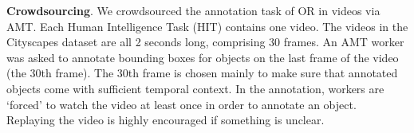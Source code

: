 \documentclass[10pt,twocolumn,letterpaper]{article}
\begin{document}



\bigskip
\noindent
\textbf{Crowdsourcing}. We crowdsourced the annotation task of OR in videos via AMT. Each Human Intelligence Task (HIT) contains one video.
The videos in the Cityscapes dataset are all 2 seconds long, comprising 30 frames. An AMT worker was asked to annotate bounding boxes for objects on the last frame of the video (\ie the 30th frame). The 30th frame is chosen mainly to  make sure that annotated objects come with sufficient temporal context. In the annotation, workers are `forced' to watch the video at least once in order to annotate an object. Replaying the video is highly encouraged if something is unclear. 
\end{document}

